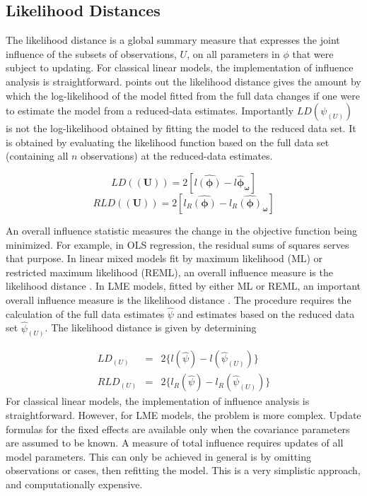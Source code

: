 \documentclass[Main.tex]{subfiles}
\begin{document}
\newpage
\subsection{Likelihood Distances}

The  likelihood distance is a global summary measure that expresses the joint influence of the subsets of observations, $U$, on all parameters in $\phi$ that were subject to updating. For classical linear models, the implementation of influence analysis is straightforward. \citet{schab} points out the likelihood distance gives the amount by which the log-likelihood of the model fitted from the full data changes if one were
to estimate the model from a reduced-data estimates. Importantly $LD(\psi_{(U)})$ is not the log-likelihood obtained by fitting the model to the reduced data set. It is obtained by evaluating the likelihood function based on the full data set (containing all $n$ observations) at the reduced-data estimates.


\[  LD(\boldsymbol{(U)})= 2[l\boldsymbol{\hat{(\phi)}} - l\boldsymbol{\hat{\phi}_\omega} ] \]
\[  RLD(\boldsymbol{(U)})= 2[ l_R\boldsymbol{\hat{(\phi)}} - l_R\boldsymbol{\hat{(\phi)}_\omega} ] \]


An overall influence statistic measures the change in the objective function being minimized. For example, in
OLS regression, the residual sums of squares serves that purpose. In linear mixed models fit by
 maximum likelihood (ML) or  restricted maximum likelihood (REML), an overall influence measure is the  likelihood distance \citep{cook}. In LME models, fitted by either ML or REML, an important overall
 influence measure is the likelihood distance \citep{cook82}. The  procedure requires the calculation of the full data estimates
 $\hat{\psi}$ and estimates based on the reduced data set  $\hat{\psi}_{(U)}$. The likelihood distance is given by
 determining
 
 
 \begin{eqnarray}
 LD_{(U)} &=& 2\{l(\hat{\psi}) - l( \hat{\psi}_{(U)}) \}\\
 RLD_{(U)} &=& 2\{l_{R}(\hat{\psi}) - l_{R}(\hat{\psi}_{(U)})\}
 \end{eqnarray}
For classical linear models, the implementation of influence analysis is straightforward.
However, for LME models, the problem is more complex. Update formulas for the fixed effects are available only when the covariance parameters are assumed to be known. A measure of total influence requires updates of all model parameters. This can only be achieved in general is by omitting observations or cases, then refitting the model. This is a very simplistic approach, and computationally expensive.
\end{document}
